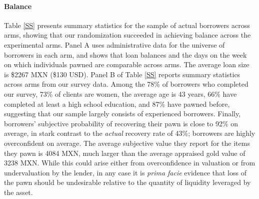 \documentclass[12pt, a4paper]{article}
\begin{document}
   

\paragraph*{Balance} Table \ref{SS} presents summary statistics for the sample of actual borrowers across arms, showing that our randomization succeeded in achieving balance across the experimental arms. Panel A uses administrative data for the universe of borrowers in each arm, and shows that loan balances and the days on the week on which individuals pawned are comparable across arms. The average loan size is \$2267 MXN (\$130 USD). Panel B of Table \ref{SS} reports summary statistics across arms from our survey data. Among the 78\% of borrowers who completed our survey, 73\% of clients are women, the average age is 43 years, 66\% have completed at least a high school education, and 87\% have pawned before, suggesting that our sample largely consists of experienced borrowers. Finally, borrowers' subjective probability of recovering their pawn is close to 92\% on average, in stark contrast to the \emph{actual} recovery rate of 43\%; borrowers are highly overconfident on average. The average subjective value they report for the items they pawn is 4084 MXN, much larger than the average appraised gold value of 3238 MXN. While this could arise either from overconfidence in valuation or from undervaluation by the lender, in any case it is \textit{prima facie} evidence that loss of the pawn should be undesirable relative to the quantity of liquidity leveraged by the asset. 
\end{document}
